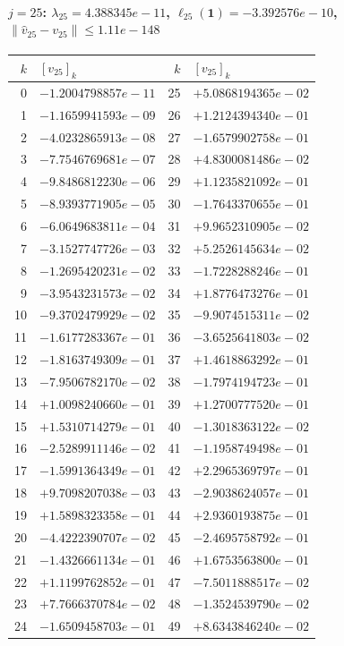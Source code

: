 \documentclass[11pt]{article}
\begin{document}
\paragraph{$j = 25$: $\lambda_{25} = 4.388345e-11$, \quad $\ell_{25}(\mathbf{1}) = -3.392576e-10$, \quad $\|\hat v_{25} - v_{25}\| \leq 1.11e-148$}
\begin{center}
{\footnotesize
\begin{tabular}{r@{\;\;}l@{\quad}r@{\;\;}l}
\toprule
$k$ & $[v_{25}]_k$ & $k$ & $[v_{25}]_k$ \\
\midrule
0 & $-1.2004798857e-11$ & 25 & $+5.0868194365e-02$ \\
1 & $-1.1659941593e-09$ & 26 & $+1.2124394340e-01$ \\
2 & $-4.0232865913e-08$ & 27 & $-1.6579902758e-01$ \\
3 & $-7.7546769681e-07$ & 28 & $+4.8300081486e-02$ \\
4 & $-9.8486812230e-06$ & 29 & $+1.1235821092e-01$ \\
5 & $-8.9393771905e-05$ & 30 & $-1.7643370655e-01$ \\
6 & $-6.0649683811e-04$ & 31 & $+9.9652310905e-02$ \\
7 & $-3.1527747726e-03$ & 32 & $+5.2526145634e-02$ \\
8 & $-1.2695420231e-02$ & 33 & $-1.7228288246e-01$ \\
9 & $-3.9543231573e-02$ & 34 & $+1.8776473276e-01$ \\
10 & $-9.3702479929e-02$ & 35 & $-9.9074515311e-02$ \\
11 & $-1.6177283367e-01$ & 36 & $-3.6525641803e-02$ \\
12 & $-1.8163749309e-01$ & 37 & $+1.4618863292e-01$ \\
13 & $-7.9506782170e-02$ & 38 & $-1.7974194723e-01$ \\
14 & $+1.0098240660e-01$ & 39 & $+1.2700777520e-01$ \\
15 & $+1.5310714279e-01$ & 40 & $-1.3018363122e-02$ \\
16 & $-2.5289911146e-02$ & 41 & $-1.1958749498e-01$ \\
17 & $-1.5991364349e-01$ & 42 & $+2.2965369797e-01$ \\
18 & $+9.7098207038e-03$ & 43 & $-2.9038624057e-01$ \\
19 & $+1.5898323358e-01$ & 44 & $+2.9360193875e-01$ \\
20 & $-4.4222390707e-02$ & 45 & $-2.4695758792e-01$ \\
21 & $-1.4326661134e-01$ & 46 & $+1.6753563800e-01$ \\
22 & $+1.1199762852e-01$ & 47 & $-7.5011888517e-02$ \\
23 & $+7.7666370784e-02$ & 48 & $-1.3524539790e-02$ \\
24 & $-1.6509458703e-01$ & 49 & $+8.6343846240e-02$ \\
\bottomrule
\end{tabular}
}
\end{center}
\end{document}
